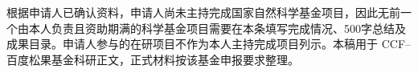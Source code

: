 \justifying
\NSFCBodyText

根据申请人已确认资料，申请人尚未主持完成国家自然科学基金项目，因此无前一个由本人负责且资助期满的科学基金项目需要在本条填写完成情况、500字总结及成果目录。申请人参与的在研项目不作为本人主持完成项目列示。本稿用于 CCF--百度松果基金科研正文，正式材料按该基金申报要求整理。
